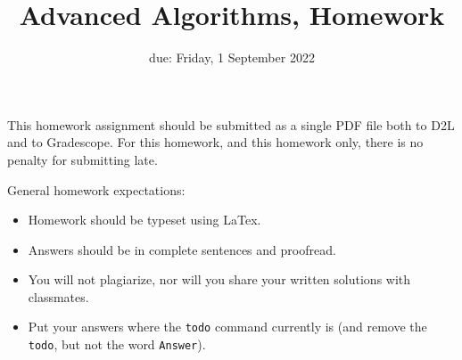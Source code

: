 \documentclass{article}
\title{Advanced Algorithms, Homework \hwnum}
\author{\todo{Your Name Here}}
\date{due: Friday, 1 September 2022}
\begin{document}
\maketitle

This homework assignment should be
submitted as a single PDF file both to D2L and to Gradescope.  For this
homework, and this homework only, there is no penalty for submitting late.

General homework expectations:
\begin{itemize}
    \item Homework should be typeset using LaTex.
    \item Answers should be in complete sentences and proofread.
    \item You will not plagiarize, nor will you share your written solutions
        with classmates.
    \item Put your answers where the \texttt{todo} command currently is (and
        remove the \texttt{todo}, but not the word \texttt{Answer}).
\end{itemize}

\end{document}
